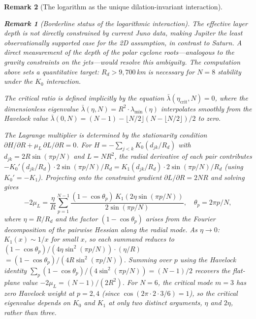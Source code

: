 \documentclass[12pt, a4paper]{article}
\newtheorem{remark}{Remark}[section]
\numberwithin{equation}{section}
\begin{document}
\begin{remark}[The logarithm as the unique dilation-invariant interaction]
\begin{remark}[Borderline status of the logarithmic interaction]
The effective layer depth is not directly constrained by current Juno
data, making Jupiter the \emph{least} observationally supported case
for the 2D assumption, in contrast to Saturn.  A direct measurement
of the depth of the polar cyclone roots---analogous to the gravity
constraints on the jets---would resolve this ambiguity.  The
computation above sets a quantitative target: $R_d > 9{,}700$\,km
is necessary for $N = 8$ stability under the $K_0$ interaction.

The critical ratio is defined implicitly by the equation
$\bar\lambda(\eta_{\mathrm{crit}}, N) = 0$, where the dimensionless
eigenvalue $\bar\lambda(\eta, N) = R^2 \cdot \lambda_{\min}(\eta)$
interpolates smoothly from the Havelock value
$\bar\lambda(0, N) = (N{-}1) - \lfloor N/2\rfloor
(N{-}\lfloor N/2\rfloor)/2$ to zero.

The Lagrange multiplier is determined by the stationarity condition
$\partial H/\partial R + \mu_L\,\partial L/\partial R = 0$.  For
$H = -\sum_{j<k}K_0(d_{jk}/R_d)$ with $d_{jk} = 2R\sin(\pi p/N)$
and $L = NR^2$, the radial derivative of each pair contributes
$-K_0'(d_{jk}/R_d)\cdot 2\sin(\pi p/N)/R_d
= K_1(d_{jk}/R_d)\cdot 2\sin(\pi p/N)/R_d$
(using $K_0' = -K_1$).  Projecting onto the constraint gradient
$\partial L/\partial R = 2NR$ and solving gives
\begin{equation}\label{eq:mu-k0}
  -2\mu_L = \frac{\eta}{R}\sum_{p=1}^{N-1}
  \frac{(1-\cos\theta_p)\,K_1(2\eta\sin(\pi p/N))}
       {2\sin(\pi p/N)},
  \quad \theta_p = 2\pi p/N,
\end{equation}
where $\eta = R/R_d$ and the factor $(1{-}\cos\theta_p)$ arises from
the Fourier decomposition of the pairwise Hessian along the radial
mode.  As $\eta \to 0$: $K_1(x) \sim 1/x$ for small $x$, so each
summand reduces to
$(1{-}\cos\theta_p)/(4\eta\sin^2(\pi p/N)) \cdot (\eta/R)$
$= (1{-}\cos\theta_p)/(4R\sin^2(\pi p/N))$.  Summing over $p$ using
the Havelock identity $\sum_p (1{-}\cos\theta_p)/(4\sin^2(\pi p/N))
= (N{-}1)/2$ recovers the flat-plane value $-2\mu_L = (N{-}1)/(2R^2)$.  For $N = 6$, the critical mode $m = 3$
has zero Havelock weight at $p = 2, 4$ (since
$\cos(2\pi \cdot 2 \cdot 3/6) = 1$), so the critical eigenvalue
depends on $K_0$ and $K_1$ at only \emph{two} distinct arguments,
$\eta$ and $2\eta$, rather than three.


\end{remark}
\end{remark}
\end{document}
